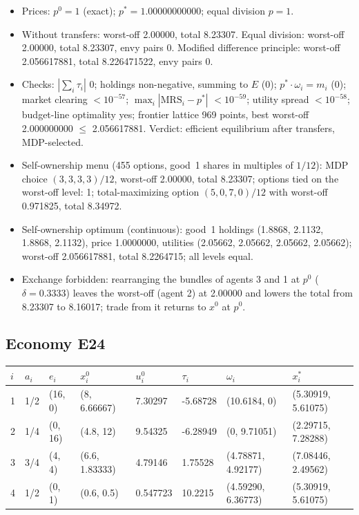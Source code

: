 \begin{itemize}[leftmargin=1.2em,itemsep=0pt,topsep=2pt]\footnotesize
\item Prices: $p^0 = 1$ (exact); $p^* = 1.00000000000$; equal division $p = 1$.
\item Without transfers: worst-off 2.00000, total 8.23307. Equal division: worst-off 2.00000, total 8.23307, envy pairs 0. Modified difference principle: worst-off 2.056617881, total 8.226471522, envy pairs 0.
\item Checks: $|\sum_i\tau_i|$ 0; holdings non-negative, summing to $E$ (0); $p^*\cdot\omega_i = m_i$ (0); market clearing $<10^{-57}$; $\max_i|\mathrm{MRS}_i - p^*|$ $<10^{-59}$; utility spread $<10^{-58}$; budget-line optimality yes; frontier lattice 969 points, best worst-off 2.000000000 $\leq$ 2.056617881. Verdict: efficient equilibrium after transfers, MDP-selected.
\item Self-ownership menu (455 options, good~1 shares in multiples of $1/12$): MDP choice $(3, 3, 3, 3)/12$, worst-off 2.00000, total 8.23307; options tied on the worst-off level: 1; total-maximizing option $(5, 0, 7, 0)/12$ with worst-off 0.971825, total 8.34972.
\item Self-ownership optimum (continuous): good~1 holdings (1.8868, 2.1132, 1.8868, 2.1132), price 1.0000000, utilities (2.05662, 2.05662, 2.05662, 2.05662); worst-off 2.056617881, total 8.2264715; all levels equal.
\item Exchange forbidden: rearranging the bundles of agents 3 and 1 at $p^0$ ($\delta = 0.3333$) leaves the worst-off (agent 2) at 2.00000 and lowers the total from 8.23307 to 8.16017; trade from it returns to $x^0$ at $p^0$.
\end{itemize}

\subsection*{Economy E24}
\label{ec:E24}
{\scriptsize\setlength{\tabcolsep}{3pt}
\begin{tabular}{@{}llllllll@{}}
\toprule
$i$ & $a_i$ & $e_i$ & $x^0_i$ & $u^0_i$ & $\tau_i$ & $\omega_i$ & $x^*_i$ \\
\midrule
1 & 1/2 & (16, 0) & (8, 6.66667) & 7.30297 & -5.68728 & (10.6184, 0) & (5.30919, 5.61075) \\
2 & 1/4 & (0, 16) & (4.8, 12) & 9.54325 & -6.28949 & (0, 9.71051) & (2.29715, 7.28288) \\
3 & 3/4 & (4, 4) & (6.6, 1.83333) & 4.79146 & 1.75528 & (4.78871, 4.92177) & (7.08446, 2.49562) \\
4 & 1/2 & (0, 1) & (0.6, 0.5) & 0.547723 & 10.2215 & (4.59290, 6.36773) & (5.30919, 5.61075) \\
\bottomrule\end{tabular}}

